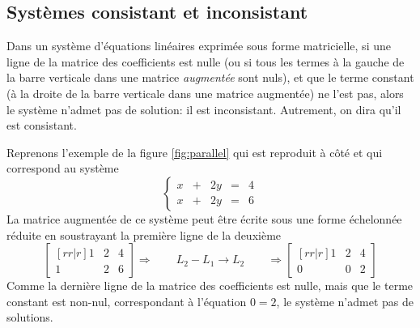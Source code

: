 \subsection{Systèmes consistant et inconsistant}
 Dans un système d'équations linéaires exprimée sous forme matricielle, si une ligne de la matrice des coefficients 
 est nulle (ou si tous les termes à la gauche de la barre verticale dans une matrice {\em augmentée} sont nuls),
  et que le terme constant (à la droite de la barre verticale dans une matrice augmentée) ne l'est pas, 
  alors le système n'admet pas de solution: il est inconsistant. Autrement, on dira qu'il est consistant.
\begin{TwoCol}
\noindent
Reprenons l'exemple de la figure \ref{fig:parallel} qui est reproduit à côté et qui
correspond au système
\[
\left\{
\begin{matrix}
x &+& 2y &=& 4 \\
x &+& 2y &=& 6
\end{matrix}
\right.
\]
La matrice augmentée de ce système peut être écrite sous une forme échelonnée
réduite en soustrayant la première ligne de la deuxième\\
\[
	\begin{bmatrix}[rr|r]
	1 & 2 & 4 \\
	1 & 2 & 6
	\end{bmatrix}
	\Rightarrow\qquad L_2 - L_1 \rightarrow L_2 \qquad\Rightarrow 
	\begin{bmatrix}[rr|r]
	1 & 2 & 4 \\
	0 & 0 & 2
	\end{bmatrix}
\]
Comme la dernière ligne de la matrice des coefficients est nulle,
mais que le terme constant est non-nul, correspondant à
l'équation $0=2$, le système n'admet pas de solutions.

\end{TwoCol}

